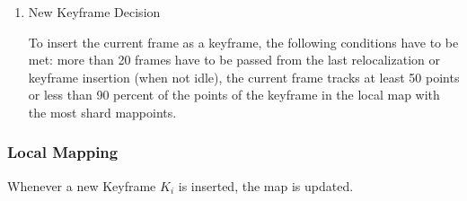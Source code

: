 \begin{enumerate}
	
	
	\item New Keyframe Decision 
	
	To insert the current frame as a keyframe, the following conditions have to be met:
	more than 20 frames have to be passed from the last relocalization or keyframe insertion (when not idle), 
    the current frame tracks at least 50 points or less than 90 percent of the points of the keyframe in the local 
    map with the most shard mappoints. 	
	
	
	\end{enumerate}
	

	
	\subsubsection{Local Mapping}
	
	Whenever a new Keyframe $K_i$ is inserted, the map is updated. 
	
